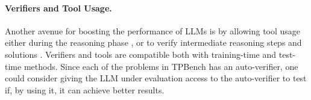 \paragraph{Verifiers and Tool Usage.}
Another avenue for boosting the performance of LLMs is by allowing tool usage \citep{schick2024toolformer, saad2024archon} either during the reasoning phase \citep{chen2022program}, or to verify intermediate reasoning steps \citep{zhang2024llamaberrypairwiseoptimizationo1like} and solutions \citep{imani2023mathprompter}. Verifiers and tools are compatible both with training-time and test-time methods. Since each of the problems in TPBench has an auto-verifier, one could consider giving the LLM under evaluation access to the auto-verifier to test if, by using it, it can achieve better results.